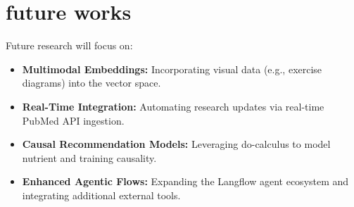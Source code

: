 \documentclass[conference]{IEEEtran}
\begin{document}
\section{future works}
Future research will focus on:
\begin{itemize}
    \item \textbf{Multimodal Embeddings:} Incorporating visual data (e.g., exercise diagrams) into the vector space.
    \item \textbf{Real-Time Integration:} Automating research updates via real-time PubMed API ingestion. \cite{11}
    \item \textbf{Causal Recommendation Models:} Leveraging do-calculus to model nutrient and training causality. \cite{5}
    \item \textbf{Enhanced Agentic Flows:} Expanding the Langflow agent ecosystem and integrating additional external tools.\\
\end{itemize}
\end{document}
